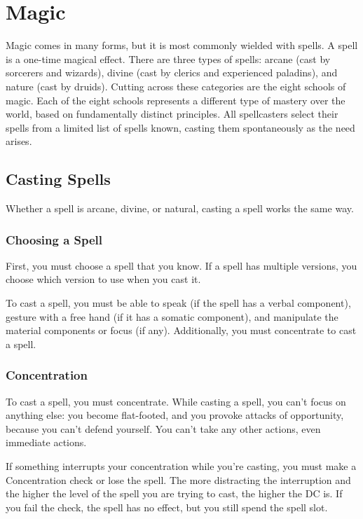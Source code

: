 \chapter{Magic}\label{Magic}
Magic comes in many forms, but it is most commonly wielded with spells. A spell is a one-time magical effect. There are three types of spells: arcane (cast by sorcerers and wizards), divine (cast by clerics and experienced paladins), and nature (cast by druids). Cutting across these categories are the eight schools of magic. Each of the eight schools represents a different type of mastery over the world, based on fundamentally distinct principles. All spellcasters select their spells from a limited list of spells known, casting them spontaneously as the need arises.

\section{Casting Spells}\label{Casting Spells}
Whether a spell is arcane, divine, or natural, casting a spell works the same way.

\subsection{Choosing a Spell}
First, you must choose a spell that you know. If a spell has multiple versions, you choose which version to use when you cast it.

To cast a spell, you must be able to speak (if the spell has a verbal component), gesture with a free hand (if it has a somatic component), and manipulate the material components or focus (if any). Additionally, you must concentrate to cast a spell.

\subsection{Concentration}
To cast a spell, you must concentrate. While casting a spell, you can't focus on anything else: you become flat-footed, and you provoke attacks of opportunity, because you can't defend yourself. You can't take any other actions, even immediate actions.

If something interrupts your concentration while you're casting, you must make a Concentration check or lose the spell. The more distracting the interruption and the higher the level of the spell you are trying to cast, the higher the DC is. If you fail the check, the spell has no effect, but you still spend the spell slot.

